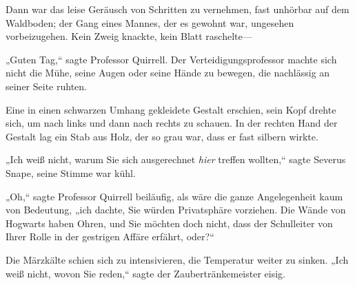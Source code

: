 Dann war das leise Geräusch von Schritten zu vernehmen, fast unhörbar auf dem Waldboden; der Gang eines Mannes, der es gewohnt war, ungesehen vorbeizugehen. Kein Zweig knackte, kein Blatt raschelte—

„Guten Tag,“ sagte Professor Quirrell. Der Verteidigungsprofessor machte sich nicht die Mühe, seine Augen oder seine Hände zu bewegen, die nachlässig an seiner Seite ruhten.

Eine in einen schwarzen Umhang gekleidete Gestalt erschien, sein Kopf drehte sich, um nach links und dann nach rechts zu schauen. In der rechten Hand der Gestalt lag ein Stab aus Holz, der so grau war, dass er fast silbern wirkte.

„Ich weiß nicht, warum Sie sich ausgerechnet \emph{hier} treffen wollten,“ sagte Severus Snape, seine Stimme war kühl.

„Oh,“ sagte Professor Quirrell beiläufig, als wäre die ganze Angelegenheit kaum von Bedeutung, „ich dachte, Sie würden Privatsphäre vorziehen. Die Wände von Hogwarts haben Ohren, und Sie möchten doch nicht, dass der Schulleiter von Ihrer Rolle in der gestrigen Affäre erfährt, oder?“

Die Märzkälte schien sich zu intensivieren, die Temperatur weiter zu sinken. „Ich weiß nicht, wovon Sie reden,“ sagte der Zaubertränkemeister eisig.

